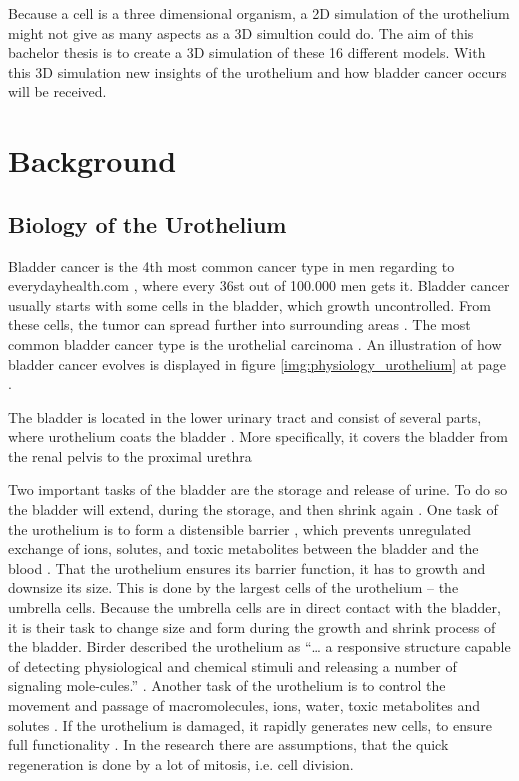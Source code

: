 Because a cell is a three dimensional organism, a 2D simulation of the urothelium might not give as many aspects as a 3D simultion could do. The aim of this bachelor thesis is to create a 3D simulation of these 16 different models. With this 3D simulation new insights of the urothelium and how bladder cancer occurs will be received. 

\section{Background}
\subsection{Biology of the Urothelium}
Bladder cancer is the 4th most common cancer type in men regarding to everydayhealth.com \cite{EveryDayHealth.com}, where every 36st out of 100.000 men gets it. Bladder cancer usually starts with some cells in the bladder, which growth uncontrolled. From these cells, the tumor can spread further into surrounding areas \cite{Cancer.org}. The most common bladder cancer type is the urothelial carcinoma \cite{Cancer.org}. An illustration of how bladder cancer evolves is displayed in figure \ref{img:physiology_urothelium} at page \pageref{img:physiology_urothelium}.

The bladder is located in the lower urinary tract and consist of several parts, where urothelium coats the bladder \cite{Lazzeri2006}. More specifically, it covers the bladder from the renal pelvis to the proximal urethra \cite{Yamany2014, Birder2005} 

Two important tasks of the bladder are the storage and release of urine. To do so the bladder will extend, during the storage, and then shrink again \cite{Karl-ErikAndersson2004}. One task of the urothelium is to form a distensible barrier \cite{Apodaca2004, Lazzeri2006, PuneetKhandelwal2009, Lewis2000, WRCross2005}, which prevents unregulated exchange of ions, solutes, and toxic metabolites between the bladder and the blood \cite{Apodaca2004, Lazzeri2006, PuneetKhandelwal2009, Lewis2000}. That the urothelium ensures its barrier function, it has to growth and downsize its size. This is done by the largest cells of the urothelium – the umbrella cells. Because the umbrella cells are in direct contact with the bladder, it is their task to change size and form during the growth and shrink process of the bladder. Birder described the urothelium as “… a responsive structure capable of detecting physiological and chemical stimuli and releasing a number of signaling mole-cules.” \cite{Birder2005}. Another task of the urothelium is to control the movement and passage of macromolecules, ions, water, toxic metabolites and solutes \cite{Apodaca2004, PuneetKhandelwal2009}. If the urothelium is damaged, it rapidly generates new cells, to ensure full functionality \cite{Apodaca2004, Yamany2014, PuneetKhandelwal2009}. In the research there are assumptions, that the quick regeneration is done by a lot of mitosis, i.e. cell division.

